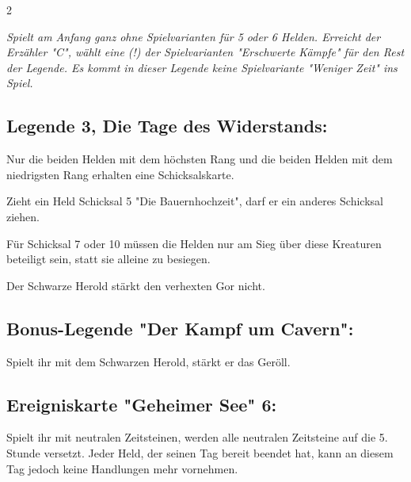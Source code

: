 \documentclass[10pt, a4paper, oneside]{book}
\newcommand{\fan}[1]{\textit{#1}}
\begin{document}
\begin{multicols*}{2}
\begin{bgcolor}
\fan{Spielt am Anfang ganz ohne Spielvarianten für 5 oder 6 Helden. Erreicht der Erzähler "C", wählt eine (!) der Spielvarianten "Erschwerte Kämpfe" für den Rest der Legende. Es kommt in dieser Legende keine Spielvariante "Weniger Zeit" ins Spiel.}









\subsection{Legende 3, Die Tage des Widerstands:}



Nur die beiden Helden mit dem höchsten Rang und die beiden Helden mit dem niedrigsten Rang erhalten eine Schicksalskarte.
\supercite{nh-begleitheft,dh-begleitheft,mh-begleitheft,bibo-bonus-heft}


Zieht ein Held Schicksal 5 "Die Bauernhochzeit", darf er ein anderes Schicksal ziehen.
\supercite{nh-begleitheft,dh-begleitheft,mh-begleitheft,bibo-bonus-heft}

Für Schicksal 7 oder 10 müssen die Helden nur am Sieg über diese Kreaturen beteiligt sein, statt sie alleine zu besiegen.
\supercite{nh-begleitheft,dh-begleitheft,mh-begleitheft,bibo-bonus-heft}

Der Schwarze Herold stärkt den verhexten Gor nicht.
\supercite{nh-begleitheft,dh-begleitheft,bibo-bonus-heft}





\subsection{Bonus-Legende "Der Kampf um Cavern":}

Spielt ihr mit dem Schwarzen Herold, stärkt er das Geröll.
\supercite{bl-kuc-b}




\subsection{Ereigniskarte "Geheimer See" 6:}

Spielt ihr mit neutralen Zeitsteinen, werden alle neutralen Zeitsteine auf die 5. Stunde versetzt. Jeder Held, der seinen Tag bereit beendet hat, kann an diesem Tag jedoch keine Handlungen mehr vornehmen.
\supercite{nh-begleitheft,dh-begleitheft,mh-begleitheft,bibo-bonus-heft}


\end{bgcolor}
\end{multicols*}
\end{document}
